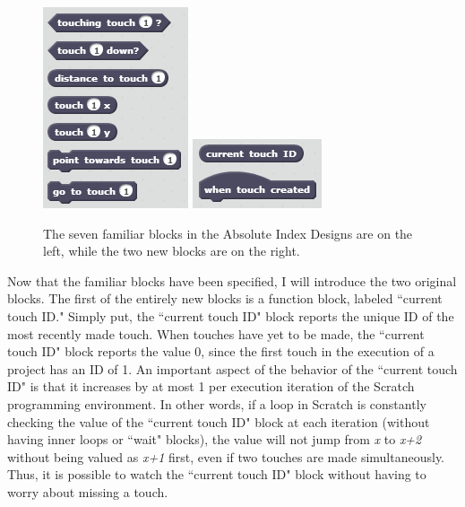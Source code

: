 \begin{figure}
\centering
\includegraphics{images/FamiliarAIDBlocks.PNG}
\includegraphics{images/NewAIDBlocks.PNG}
\caption[The Absolute Indexing Design Interaction Set]
{The seven familiar blocks in the Absolute Index Designs are on the left, while the two new blocks are on the right.}
\label{FamiliarAIDBlocks}
\end{figure}

Now that the familiar blocks have been specified, I will introduce the two original blocks. The first of the entirely new blocks is a function block, labeled ``current touch ID." Simply put, the ``current touch ID" block reports the unique ID of the most recently made touch. When touches have yet to be made, the ``current touch ID" block reports the value 0, since the first touch in the execution of a project has an ID of 1. An important aspect of the behavior of the ``current touch ID" is that it increases by at most 1 per execution iteration of the Scratch programming environment. In other words, if a loop in Scratch is constantly checking the value of the ``current touch ID" block at each iteration (without having inner loops or ``wait" blocks), the value will not jump from \emph{x} to \emph{x+2} without being valued as \emph{x+1} first, even if two touches are made simultaneously. Thus, it is possible to watch the ``current touch ID" block without having to worry about missing a touch.

